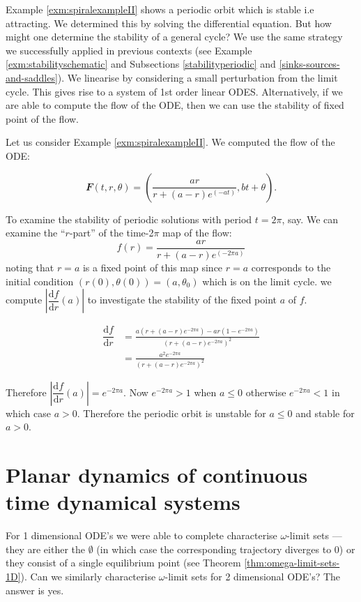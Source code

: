 \documentclass[
  a4paper,
  oneside,
  final]{krantz}
\renewcommand{\d}{\mathrm{d}}
\renewcommand{\v}[1]{{\mathbfit{#1}}}
\newcommand{\der}[2]{\dfrac{\d #1}{\d #2}}
\theoremstyle{definition}
\theoremstyle{definition}
\theoremstyle{definition}
\theoremstyle{definition}
\theoremstyle{remark}
\begin{document}
Example \ref{exm:spiralexampleII} shows a periodic orbit which is stable i.e attracting. We determined this by solving the differential equation. But how might one determine the stability of a general cycle? We use the same strategy we successfully applied in previous contexts (see Example \ref{exm:stabilityschematic} and Subsections \ref{stabilityperiodic} and \ref{sinks-sources-and-saddles}). We linearise by considering a small perturbation from the limit cycle. This gives rise to a system of 1st order linear ODES. Alternatively, if we are able to compute the flow of the ODE, then we can use the stability of fixed point of the flow.

Let us consider Example \ref{exm:spiralexampleII}. We computed the flow of the ODE:

\[ \v{F}(t,r, \theta) = \left(\frac{ ar}{ r + (a-r) e^{(-at)}}, bt + \theta\right).\]

To examine the stability of periodic solutions with period \(t = 2\pi\), say. We can examine the ``\(r\)-part'' of the time-2\(\pi\) map of the flow: \[f(r) = \frac{ ar}{ r + (a-r) e^{(-2\pi a)}}\] noting that \(r= a\) is a fixed point of this map since \(r=a\) corresponds to the initial condition \((r(0), \theta(0)) = (a, \theta_0)\) which is on the limit cycle. we compute \(\left| \der{f}{r}(a)\right|\) to investigate the stability of the fixed point \(a\) of \(f\).

\begin{align*}
\der{f}{r} &= \frac{a ( r + (a-r)e^{-2\pi a}) - ar(1- e^{-2\pi a})}{(r + (a-r)e^{-2\pi a})^2 } \\
           &= \frac{ a^2 e^{-2 \pi a} }{(r + (a-r)e^{-2\pi a})^2} 
\end{align*}

Therefore \(\left|\der{f}{r} (a) \right | = e^{-2\pi a}\). Now \(e^{-2\pi a} > 1\) when \(a \le 0\) otherwise \(e^{-2\pi a} <1\) in which case \(a >0\). Therefore the periodic orbit is unstable for \(a\le 0\) and stable for \(a>0\).

\hypertarget{planardynamics}{%
\section{Planar dynamics of continuous time dynamical systems}\label{planardynamics}}

For 1 dimensional ODE's we were able to complete characterise \(\omega\)-limit sets --- they are either the \(\emptyset\) (in which case the corresponding trajectory diverges to \(0\)) or they consist of a single equilibrium point (see Theorem \ref{thm:omega-limit-sets-1D}). Can we similarly characterise \(\omega\)-limit sets for 2 dimensional ODE's? The answer is yes.
\end{document}
